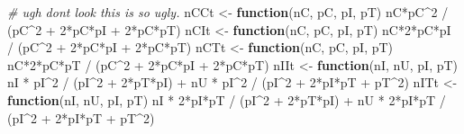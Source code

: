 \documentclass[
]{article}
\newenvironment{Shaded}{\begin{snugshade}}{\end{snugshade}}
\newcommand{\CommentTok}[1]{\textcolor[rgb]{0.56,0.35,0.01}{\textit{#1}}}
\newcommand{\ControlFlowTok}[1]{\textcolor[rgb]{0.13,0.29,0.53}{\textbf{#1}}}
\newcommand{\DecValTok}[1]{\textcolor[rgb]{0.00,0.00,0.81}{#1}}
\newcommand{\NormalTok}[1]{#1}
\newcommand{\OtherTok}[1]{\textcolor[rgb]{0.56,0.35,0.01}{#1}}
\newcommand{\SpecialCharTok}[1]{\textcolor[rgb]{0.00,0.00,0.00}{#1}}
\begin{document}
\begin{Shaded}
\begin{Highlighting}[]
\CommentTok{\# ugh don\textquotesingle{}t look this is so ugly. }
\NormalTok{nCCt }\OtherTok{\textless{}{-}} \ControlFlowTok{function}\NormalTok{(nC, pC, pI, pT) nC}\SpecialCharTok{*}\NormalTok{pC}\SpecialCharTok{\^{}}\DecValTok{2} \SpecialCharTok{/}\NormalTok{ (pC}\SpecialCharTok{\^{}}\DecValTok{2} \SpecialCharTok{+} \DecValTok{2}\SpecialCharTok{*}\NormalTok{pC}\SpecialCharTok{*}\NormalTok{pI }\SpecialCharTok{+} \DecValTok{2}\SpecialCharTok{*}\NormalTok{pC}\SpecialCharTok{*}\NormalTok{pT)}
\NormalTok{nCIt }\OtherTok{\textless{}{-}} \ControlFlowTok{function}\NormalTok{(nC, pC, pI, pT) nC}\SpecialCharTok{*}\DecValTok{2}\SpecialCharTok{*}\NormalTok{pC}\SpecialCharTok{*}\NormalTok{pI }\SpecialCharTok{/}\NormalTok{ (pC}\SpecialCharTok{\^{}}\DecValTok{2} \SpecialCharTok{+} \DecValTok{2}\SpecialCharTok{*}\NormalTok{pC}\SpecialCharTok{*}\NormalTok{pI }\SpecialCharTok{+} \DecValTok{2}\SpecialCharTok{*}\NormalTok{pC}\SpecialCharTok{*}\NormalTok{pT)}
\NormalTok{nCTt }\OtherTok{\textless{}{-}} \ControlFlowTok{function}\NormalTok{(nC, pC, pI, pT) nC}\SpecialCharTok{*}\DecValTok{2}\SpecialCharTok{*}\NormalTok{pC}\SpecialCharTok{*}\NormalTok{pT }\SpecialCharTok{/}\NormalTok{ (pC}\SpecialCharTok{\^{}}\DecValTok{2} \SpecialCharTok{+} \DecValTok{2}\SpecialCharTok{*}\NormalTok{pC}\SpecialCharTok{*}\NormalTok{pI }\SpecialCharTok{+} \DecValTok{2}\SpecialCharTok{*}\NormalTok{pC}\SpecialCharTok{*}\NormalTok{pT)}
\NormalTok{nIIt }\OtherTok{\textless{}{-}} \ControlFlowTok{function}\NormalTok{(nI, nU, pI, pT) nI }\SpecialCharTok{*}\NormalTok{ pI}\SpecialCharTok{\^{}}\DecValTok{2} \SpecialCharTok{/}\NormalTok{ (pI}\SpecialCharTok{\^{}}\DecValTok{2} \SpecialCharTok{+} \DecValTok{2}\SpecialCharTok{*}\NormalTok{pT}\SpecialCharTok{*}\NormalTok{pI) }\SpecialCharTok{+}\NormalTok{ nU }\SpecialCharTok{*}\NormalTok{ pI}\SpecialCharTok{\^{}}\DecValTok{2} \SpecialCharTok{/}\NormalTok{ (pI}\SpecialCharTok{\^{}}\DecValTok{2} \SpecialCharTok{+} \DecValTok{2}\SpecialCharTok{*}\NormalTok{pI}\SpecialCharTok{*}\NormalTok{pT }\SpecialCharTok{+}\NormalTok{ pT}\SpecialCharTok{\^{}}\DecValTok{2}\NormalTok{)}
\NormalTok{nITt }\OtherTok{\textless{}{-}} \ControlFlowTok{function}\NormalTok{(nI, nU, pI, pT) nI }\SpecialCharTok{*} \DecValTok{2}\SpecialCharTok{*}\NormalTok{pI}\SpecialCharTok{*}\NormalTok{pT }\SpecialCharTok{/}\NormalTok{ (pI}\SpecialCharTok{\^{}}\DecValTok{2} \SpecialCharTok{+} \DecValTok{2}\SpecialCharTok{*}\NormalTok{pT}\SpecialCharTok{*}\NormalTok{pI) }\SpecialCharTok{+}\NormalTok{ nU }\SpecialCharTok{*} \DecValTok{2}\SpecialCharTok{*}\NormalTok{pI}\SpecialCharTok{*}\NormalTok{pT }\SpecialCharTok{/}\NormalTok{ (pI}\SpecialCharTok{\^{}}\DecValTok{2} \SpecialCharTok{+} \DecValTok{2}\SpecialCharTok{*}\NormalTok{pI}\SpecialCharTok{*}\NormalTok{pT }\SpecialCharTok{+}\NormalTok{ pT}\SpecialCharTok{\^{}}\DecValTok{2}\NormalTok{)}

\end{Highlighting}
\end{Shaded}
\end{document}
